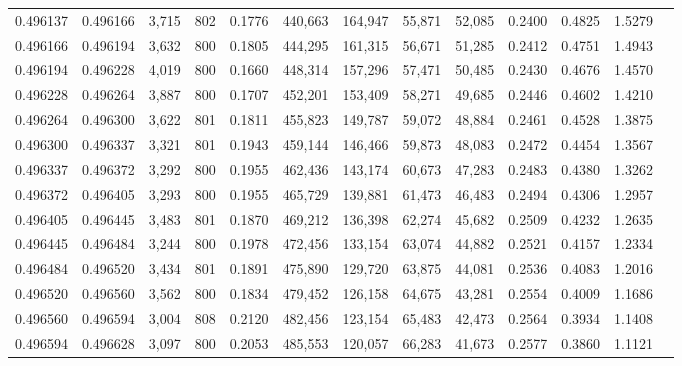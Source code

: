 \begin{tabular}{rrrrrrrrrrrrr}
0.496137 & 0.496166 &  3,715 & 802 &                                     0.1776 & 440,663 & 164,947 &  55,871 &  52,085 & 0.2400 & 0.4825 & 1.5279 \\
0.496166 & 0.496194 &  3,632 & 800 &                                     0.1805 & 444,295 & 161,315 &  56,671 &  51,285 & 0.2412 & 0.4751 & 1.4943 \\
0.496194 & 0.496228 &  4,019 & 800 &                                     0.1660 & 448,314 & 157,296 &  57,471 &  50,485 & 0.2430 & 0.4676 & 1.4570 \\
0.496228 & 0.496264 &  3,887 & 800 &                                     0.1707 & 452,201 & 153,409 &  58,271 &  49,685 & 0.2446 & 0.4602 & 1.4210 \\
0.496264 & 0.496300 &  3,622 & 801 &                                     0.1811 & 455,823 & 149,787 &  59,072 &  48,884 & 0.2461 & 0.4528 & 1.3875 \\
0.496300 & 0.496337 &  3,321 & 801 &                                     0.1943 & 459,144 & 146,466 &  59,873 &  48,083 & 0.2472 & 0.4454 & 1.3567 \\
0.496337 & 0.496372 &  3,292 & 800 &                                     0.1955 & 462,436 & 143,174 &  60,673 &  47,283 & 0.2483 & 0.4380 & 1.3262 \\
0.496372 & 0.496405 &  3,293 & 800 &                                     0.1955 & 465,729 & 139,881 &  61,473 &  46,483 & 0.2494 & 0.4306 & 1.2957 \\
0.496405 & 0.496445 &  3,483 & 801 &                                     0.1870 & 469,212 & 136,398 &  62,274 &  45,682 & 0.2509 & 0.4232 & 1.2635 \\
0.496445 & 0.496484 &  3,244 & 800 &                                     0.1978 & 472,456 & 133,154 &  63,074 &  44,882 & 0.2521 & 0.4157 & 1.2334 \\
0.496484 & 0.496520 &  3,434 & 801 &                                     0.1891 & 475,890 & 129,720 &  63,875 &  44,081 & 0.2536 & 0.4083 & 1.2016 \\
0.496520 & 0.496560 &  3,562 & 800 &                                     0.1834 & 479,452 & 126,158 &  64,675 &  43,281 & 0.2554 & 0.4009 & 1.1686 \\
0.496560 & 0.496594 &  3,004 & 808 &                                     0.2120 & 482,456 & 123,154 &  65,483 &  42,473 & 0.2564 & 0.3934 & 1.1408 \\
0.496594 & 0.496628 &  3,097 & 800 &                                     0.2053 & 485,553 & 120,057 &  66,283 &  41,673 & 0.2577 & 0.3860 & 1.1121 \\

\end{tabular}
